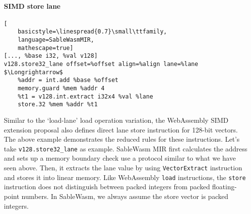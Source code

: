 \paragraph{SIMD store lane} \quad
\begin{lstlisting}[
    basicstyle=\linespread{0.7}\small\ttfamily, 
    language=SableWasmMIR, 
    mathescape=true]
[..., %base i32, %val v128]
v128.store32_lane offset=%offset align=%align lane=%lane $\Longrightarrow$
    %addr = int.add %base %offset
    memory.guard %mem %addr 4
    %t1 = v128.int.extract i32x4 %val %lane
    store.32 %mem %addr %t1
\end{lstlisting}
Similar to the `load-lane' load operation variation, the WebAssembly SIMD
extension proposal also defines direct lane store instruction for 128-bit
vectors. The above example demonstrates the reduced rules for these
instructions. Let's take \texttt{v128.store32\_lane} as example. SableWasm MIR
first calculates the address and sets up a memory boundary check use a protocol
similar to what we have seen above. Then, it extracts the lane value by using
\texttt{VectorExtract} instruction and stores it into linear memory. Like
WebAssembly \texttt{load} instructions, the \texttt{store} instruction does
not distinguish between packed integers from packed floating-point numbers.
In SableWasm, we always assume the store vector is packed integers.
